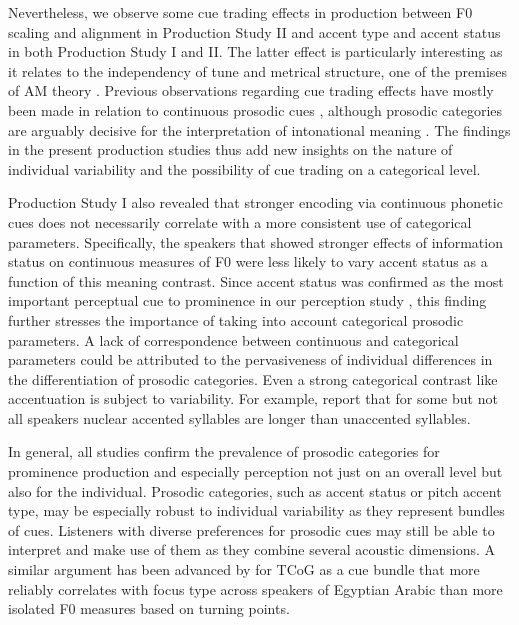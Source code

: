 Nevertheless, we observe some cue trading effects in production between F0 scaling and alignment in Production Study II and accent type and accent status in both Production Study I and II. The latter effect is particularly interesting as it relates to the independency of tune and metrical structure, one of the premises of AM theory \citep{laddIntonationalPhonology2008}. Previous observations regarding cue trading effects have mostly been made in relation to continuous prosodic cues \citep{ipSearchSalienceFocus2021, arvanitiVariabilityOverlapCue2024, severijnenYourVOORnaamNot2024}, although prosodic categories are arguably decisive for the interpretation of intonational meaning \citep{laddIntonationalPhonology2008}. The findings in the present production studies thus add new insights on the nature of individual variability and the possibility of cue trading on a categorical level.

Production Study I also revealed that stronger encoding via continuous phonetic cues does not necessarily correlate with a more consistent use of categorical parameters. Specifically, the speakers that showed stronger effects of information status on continuous measures of F0 were less likely to vary accent status as a function of this meaning contrast. Since accent status was confirmed as the most important perceptual cue to prominence in our perception study \citep[also in line with previous studies by][]{baumannWhatMakesWord2018, wagnerExploitingSpeechgestureLink2019}, this finding further stresses the importance of taking into account categorical prosodic parameters. A lack of correspondence between continuous and categorical parameters could be attributed to the pervasiveness of individual differences in the differentiation of prosodic categories. Even a strong categorical contrast like accentuation is subject to variability. For example, \citet{beckmanArticulatoryEvidenceDifferentiating1994} report that for some but not all speakers nuclear accented syllables are longer than unaccented syllables.

In general, all studies confirm the prevalence of prosodic categories for prominence production and especially perception not just on an overall level but also for the individual. Prosodic categories, such as accent status or pitch accent type, may be especially robust to individual variability as they represent bundles of cues. Listeners with diverse preferences for prosodic cues may still be able to interpret and make use of them as they combine several acoustic dimensions. A similar argument has been advanced by \citet{bruggemanUnifyingSpeakerVariability2017} for TCoG as a cue bundle that more reliably correlates with focus type across speakers of Egyptian Arabic than more isolated F0 measures based on turning points.

